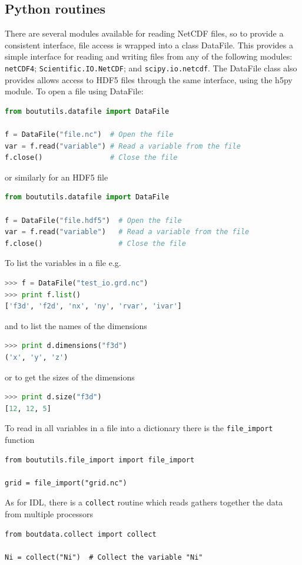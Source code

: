 \documentclass[12pt]{article}
\begin{document}
\subsection{Python routines}
%
\label{sec:pythonroutines}
%
%
There are several modules available for reading NetCDF files, so to provide a
consistent interface, file access is wrapped into a class DataFile. This
provides a simple interface for reading and writing files from any of the
following modules: \texttt{netCDF4}; \texttt{Scientific.IO.NetCDF}; and
\texttt{scipy.io.netcdf}. The DataFile class also provides allows access to
HDF5 files through the same interface, using the h5py module.  To open a file
using DataFile:
%
\begin{lstlisting}[language=python,numbers=none]
from boututils.datafile import DataFile

f = DataFile("file.nc")  # Open the file
var = f.read("variable") # Read a variable from the file
f.close()                # Close the file
\end{lstlisting}
%
or similarly for an HDF5 file
%
\begin{lstlisting}[language=python,numbers=none]
from boututils.datafile import DataFile

f = DataFile("file.hdf5")  # Open the file
var = f.read("variable")   # Read a variable from the file
f.close()                  # Close the file
\end{lstlisting}


To list the variables in a file e.g.
%
\begin{lstlisting}[language=python,numbers=none]
>>> f = DataFile("test_io.grd.nc")
>>> print f.list()
['f3d', 'f2d', 'nx', 'ny', 'rvar', 'ivar']
\end{lstlisting}
%
and to list the names of the dimensions
%
\begin{lstlisting}[language=python,numbers=none]
>>> print d.dimensions("f3d")
('x', 'y', 'z')
\end{lstlisting}
%
or to get the sizes of the dimensions
%
\begin{lstlisting}[language=python,numbers=none]
>>> print d.size("f3d")
[12, 12, 5]
\end{lstlisting}
%
To read in all variables in a file into a dictionary there is the
\texttt{file\_import} function
%
\begin{lstlisting}
from boututils.file_import import file_import

grid = file_import("grid.nc")
\end{lstlisting}
%
As for IDL, there is a \texttt{collect} routine which reads gathers together
the data from multiple processors
%
\begin{lstlisting}
from boutdata.collect import collect

Ni = collect("Ni")  # Collect the variable "Ni"
\end{lstlisting}
%
\end{document}
